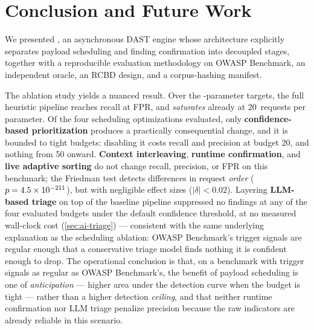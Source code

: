 
\section{Conclusion and Future Work}
\label{sec:conclusion}

We presented \herramienta, an asynchronous DAST engine whose architecture
explicitly separates payload scheduling and finding confirmation into
decoupled stages, together with a reproducible evaluation methodology on
OWASP Benchmark, an independent oracle, an RCBD design, and a
corpus-hashing manifest.

The ablation study yields a nuanced result. Over the \NumObjetivos{}
-parameter targets, the full heuristic pipeline reaches
\ValorRecallTecho{} recall at \ValorFPRBaseline{} FPR, and \emph{saturates}
already at \num{20}~requests per parameter. Of the four scheduling
optimizations evaluated, only \textbf{confidence-based prioritization}
produces a practically consequential change, and it is bounded to tight
budgets: disabling it costs \DeltaRecallNoPriority{} recall and
\DeltaPrecisionNoPriority{} precision at budget \num{20}, and nothing from
\num{50} onward. \textbf{Context interleaving}, \textbf{runtime
confirmation}, and \textbf{live adaptive sorting} do not change recall,
precision, or FPR on this benchmark; the Friedman test detects differences in
request \emph{order} ($p = \num{4.5e-211}{}$), but with negligible effect
sizes ($\lvert\delta\rvert < \num{0.02}$). Layering \textbf{LLM-based triage}
on top of the baseline pipeline suppressed no findings at any of the four
evaluated budgets under the default confidence threshold, at no measured
wall-clock cost (\cref{sec:ai-triage}) ---
consistent with the same underlying explanation as the scheduling ablation:
OWASP Benchmark's trigger signals are regular enough that a conservative
triage model finds nothing it is confident enough to drop. The operational
conclusion is that, on a benchmark with trigger signals as regular as OWASP
Benchmark's, the benefit of payload scheduling is one of \emph{anticipation}
--- higher area under the detection curve when the budget is tight --- rather
than a higher detection \emph{ceiling}, and that neither runtime confirmation
nor LLM triage penalize precision because the raw indicators are already
reliable in this scenario.

